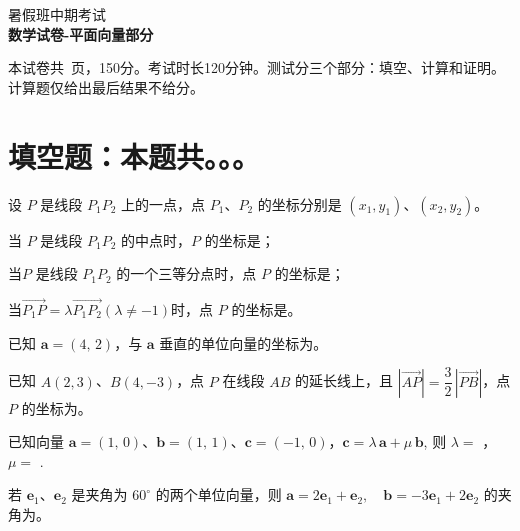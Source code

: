 \documentclass[12pt, a4paper]{article}
\def\mycenter#1{\begin{center} \bf \sffamily \large #1 \end{center}}
\begin{document}
\begin{center}
    \huge 暑假班中期考试 \\
    \Large \bf \sffamily 数学试卷-平面向量部分
\end{center}

本试卷共\pageref{LastPage}\ 页，150分。考试时长120分钟。测试分三个部分：填空、计算和证明。计算题仅给出最后结果不给分。


\section{填空题：本题共。。。}
\begin{question}[resume]
\item 设 $P$ 是线段 $P_{1}P_{2}$ 上的一点，点 $P_{1}$、$P_{2}$ 的坐标分别是 $(x_{1},y_{1})$、$(x_{2},y_{2})$。
\begin{question}
    \item 当 $P$ 是线段 $P_{1}P_{2}$ 的中点时，$P$ 的坐标是\underline{\hspace{6em}}；
    \item 当$P$ 是线段 $P_{1}P_{2}$ 的一个三等分点时，点 $P$ 的坐标是\underline{\hspace{6em}}；
    \item 当$\overrightarrow{P_1P}=\lambda \overrightarrow{P_1P_2}(\lambda\neq -1)$时，点 $P$ 的坐标是\underline{\hspace{8em}}。
\end{question}
\item 已知 $\bm{a} = (4,\,2)$，与 $\bm{a}$ 垂直的单位向量的坐标为\underline{\hspace{6em}}。
\item 已知 $A(2,3)$、$B(4,-3)$，点 $P$ 在线段 $AB$ 的延长线上，且
$| \overrightarrow{AP}|=\dfrac{3}{2}\,| \overrightarrow{PB}|$，点 $P$ 的坐标为\underline{\hspace{6em}}。
\item 已知向量 $\bm{a}=(1,\,0)$、$\bm{b}=(1,\,1)$、$\bm{c}=(-1,\,0)$，$\bm{c}=\lambda\,\bm{a}+\mu\,\bm{b}$, 则 $\lambda=$ \underline{\hspace{6em}}， $\mu=$ \underline{\hspace{6em}}.
\item 若 $\bm{e}_{1}$、$\bm{e}_{2}$ 是夹角为 $60^\circ$ 的两个单位向量，则
$
\bm{a}=2\bm{e}_{1}+\bm{e}_{2}, \quad
\bm{b}=-3\bm{e}_{1}+2\bm{e}_{2}
$
的夹角为\underline{\hphantom{3cm}}。


\end{question}
\end{document}
